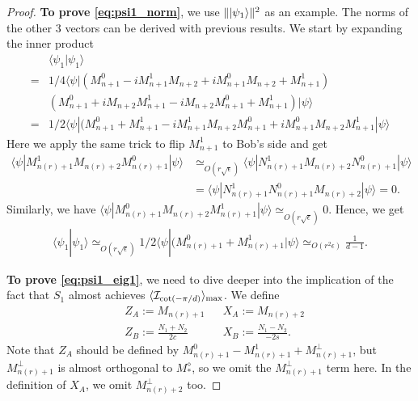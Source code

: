 \documentclass[11pt,letterpaper]{article}
\newcommand{\ket}[1]{|#1\rangle}
\newcommand{\bra}[1]{\langle#1|}
\newcommand{\braket}[2]{\langle#1|#2\rangle}
\DeclarePairedDelimiter{\norm}{\lVert}{\rVert}
\DeclarePairedDelimiter{\ip}{\langle}{\rangle}
\newcommand{\1}{\mathbb{1}}
\newcommand{\nr}{n(r)}
\newcommand{\I}{\mathcal{I}}
\newcommand{\ep}{\epsilon}
\newcommand{\se}{\sqrt{\epsilon}}
\newcommand{\sd}{\sqrt{d}}
\newcommand{\appd}[1]{\simeq_{#1}}
\theoremstyle{definition}
\begin{document}
\begin{proof}
	\textbf{To prove \cref{eq:psi1_norm}}, we use $\norm{\ket{\psi_1}}^2$ as an example. 
	The norms of the other $3$ vectors can be derived with previous results.
	We start by expanding the inner product
	\begin{align*}
		&\braket{\psi_1}{\psi_1} \\
		=&1/4\bra{\psi}(M_{n+1}^0 - iM_{n+1}^1M_{n+2} + iM_{n+1}^0M_{n+2} +M_{n+1}^1)\\
		&(M_{n+1}^0 + iM_{n+2}M_{n+1}^1 -iM_{n+2}M_{n+1}^0 + M_{n+1}^1)\ket{\psi}\\
		=&1/2\bra{\psi}(M_{n+1}^0+M_{n+1}^1-iM_{n+1}^1M_{n+2}M_{n+1}^0+iM_{n+1}^0M_{n+2}M_{n+1}^1\ket{\psi}
	\end{align*}
	Here we apply the same trick to flip $M_{n+1}^1$ to Bob's side and get 
	\begin{align*}
		\bra{\psi}M_{\nr+1}^1M_{\nr+2}M_{\nr+1}^0\ket{\psi} 
		&\appd{O(r\se)} \bra{\psi}N_{\nr+1}^1M_{\nr+2}N_{\nr+1}^0\ket{\psi} \\
		&= \bra{\psi}N_{\nr+1}^1N_{\nr+1}^0M_{\nr+2}\ket{\psi} = 0.
	\end{align*}
	Similarly, we have $\bra{\psi}M_{\nr+1}^0M_{\nr+2}M_{\nr+1}^1\ket{\psi} \appd{ O(r\se)} 0$.
	Hence, we get 
	\begin{align}
		\braket{\psi_1}{\psi_1} \appd{O(r\se)} 1/2\bra{\psi}(M_{\nr+1}^0+M_{\nr+1}^1\ket{\psi} \appd{O(r^2\ep)} 
		 \frac{1}{d-1}.
	\end{align}
	
	\textbf{To prove \cref{eq:psi1_eig1}},
	we need to dive deeper into the implication of the fact that $S_1$ almost achieves $\ip{\I_{\cot(-\pi/d)}}_{\max}$.
	We define
	\begin{align}
		&Z_A  := M_{\nr+1} && X_A := M_{\nr+2} \\
		&Z_B := \frac{N_1+N_2}{2c} && X_B := \frac{N_1-N_2}{-2s}.
	\end{align}
	Note that $Z_A$ should be defined by $M_{\nr+1}^0 - M_{\nr+1}^1 + M_{\nr+1}^\perp$,
	but $M_{\nr+1}^\perp$ is almost orthogonal to $M_\ast^\diamond$, so we omit the $M_{\nr+1}^\perp$ term here.
	In the definition of $X_A$, we omit $M_{\nr+2}^\perp$ too.
	

\end{proof}
\end{document}
